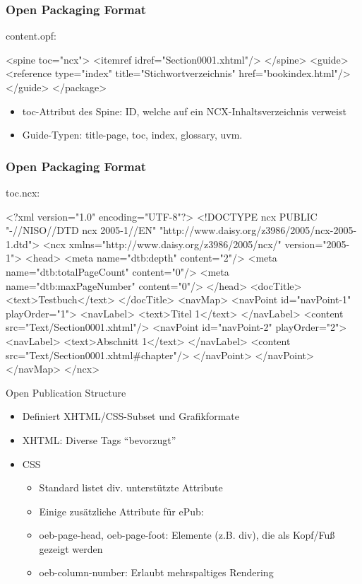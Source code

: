 \documentclass[hyperref={pdfpagelabels=false}]{beamer}
\begin{document}
\begin{frame}[fragile]
\frametitle{Open Packaging Format}
content.opf:
\begin{xml}
  <spine toc="ncx">
    <itemref idref="Section0001.xhtml"/>
  </spine>
	<guide>
		<reference type="index" title="Stichwortverzeichnis" href="bookindex.html"/>
	</guide>
</package>
\end{xml}
	\begin{itemize}
		\item toc-Attribut des Spine: ID, welche auf ein NCX-Inhaltsverzeichnis verweist
		\item Guide-Typen: title-page, toc, index, glossary, uvm.
	\end{itemize}
\end{frame}

\begin{frame}[fragile]
\frametitle{Open Packaging Format}
toc.ncx:
\begin{xml}
<?xml version="1.0" encoding="UTF-8"?>
<!DOCTYPE ncx PUBLIC "-//NISO//DTD ncx 2005-1//EN" "http://www.daisy.org/z3986/2005/ncx-2005-1.dtd">
<ncx xmlns="http://www.daisy.org/z3986/2005/ncx/" version="2005-1">
  <head>
    <meta name="dtb:depth" content="2"/>
    <meta name="dtb:totalPageCount" content="0"/>
    <meta name="dtb:maxPageNumber" content="0"/>
  </head>
  <docTitle>
    <text>Testbuch</text>
  </docTitle>
  <navMap>
    <navPoint id="navPoint-1" playOrder="1">
      <navLabel>
        <text>Titel 1</text>
      </navLabel>
      <content src="Text/Section0001.xhtml"/>
      <navPoint id="navPoint-2" playOrder="2">
        <navLabel>
          <text>Abschnitt 1</text>
        </navLabel>
        <content src="Text/Section0001.xhtml#chapter"/>
      </navPoint>
    </navPoint>
  </navMap>
</ncx>
\end{xml}
\end{frame}

\begin{frame}{Open Publication Structure}
	\begin{itemize}
		\item Definiert XHTML/CSS-Subset und Grafikformate
		\item XHTML: Diverse Tags "`bevorzugt"'
		\item CSS
		\begin{itemize}
			\item Standard listet div. unterstützte Attribute
			\item Einige zusätzliche Attribute für ePub:
			\item oeb-page-head, oeb-page-foot: Elemente (z.B. div), die als Kopf/Fuß gezeigt werden
			\item oeb-column-number: Erlaubt mehrspaltiges Rendering
		\end{itemize}
	\end{itemize}
\end{frame}
\end{document}
